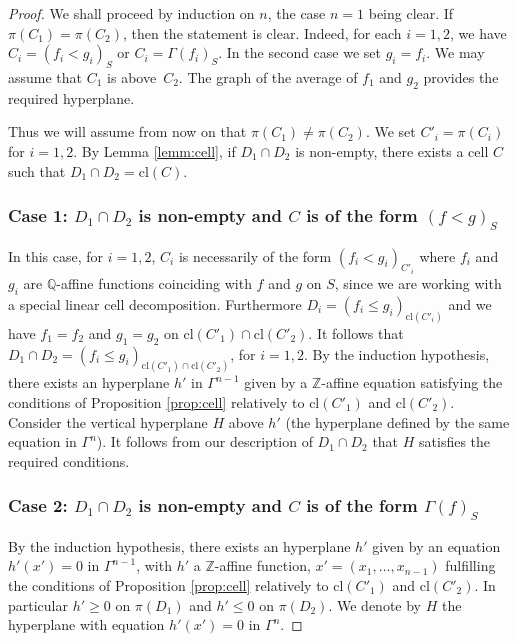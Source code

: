 \documentclass[10pt]{amsart}
\theoremstyle{definition}
\theoremstyle{remark}
\newcommand{\cl}{\mathrm{cl}}
\newcommand{\Q}{\mathbb Q}
\newcommand{\Z}{\mathbb Z}
\theoremstyle{plain}
\theoremstyle{definition}
\begin{document}
\begin{proof}We shall proceed by induction on $n$, the case $n=1$ being clear.
If $\pi (C_1) = \pi (C_2)$, then the statement is clear. Indeed, for each $i = 1, 2$, we have
$C_i = (f_i < g_i)_S$ or $C_i = \Gamma(f_i)_S$. In the second case we set $g_i = f_i$.
We may assume that $C_1$ is above~$C_2$. The graph of the average of $f_1$ and $g_2$ provides the required hyperplane.

Thus we will assume from now on that $\pi (C_1) \neq \pi (C_2)$.
We set $C'_i = \pi (C_i)$ for $i = 1, 2$.
By Lemma \ref{lemm:cell}, if $D_1 \cap D_2$ is non-empty, there exists a cell $C$ such that
$D_1 \cap D_2 = \cl (C)$.

\subsubsection*{Case 1: $D_1 \cap D_2$ is non-empty and $C$ is of the form $(f < g)_S$}

In this case, for $i = 1, 2$, $C_i$ is necessarily of the form
$(f_i < g_i)_{C'_i}$ where $f_i$ and $g_i$ are $\Q$-affine functions coinciding with $f$ and $g$ on $S$, since we are working with a special linear cell decomposition.
Furthermore $D_i = (f_i \leq g_i)_{\cl (C'_i)}$ and we have $f_1 = f_2$ and $g_1 = g_2$ on $\cl (C'_1) \cap \cl (C'_2)$.
It follows that $D_1 \cap D_2 =
(f_i \leq g_i)_{\cl (C'_1) \cap \cl (C'_2)}$, for $i = 1,2$.
By the induction hypothesis, there exists an hyperplane $h'$ in $\Gamma^{n-1}$ given by a
$\Z$-affine equation satisfying
the conditions of Proposition \ref {prop:cell} relatively to
$\cl (C'_1)$ and $\cl (C'_2)$. Consider the vertical hyperplane $H$ above $h'$ (the hyperplane defined by the same equation in $\Gamma^n$).
It follows from our description of $D_1 \cap D_2$ that $H$ satisfies the required conditions.

\subsubsection*{Case 2: $D_1 \cap D_2$ is non-empty and $C$ is of the form $\Gamma (f)_S$}

By the induction hypothesis,
there exists an hyperplane $h'$ given by an equation $h' (x')=0$ in $\Gamma^{n-1}$, with $h'$ a $\Z$-affine function, $x'=(x_1,\ldots, x_{n-1})$
fulfilling
the conditions of Proposition \ref {prop:cell} relatively to
$\cl (C'_1)$ and $\cl (C'_2)$.
In particular $h' \geq 0 $ on
$\pi (D_1)$ and $h' \leq 0$ on $\pi (D_2)$.
We denote by $H$ the hyperplane with equation $h'(x')=0$ in $\Gamma^{n}$.\enlargethispage{\baselineskip}%


\end{proof}
\end{document}
